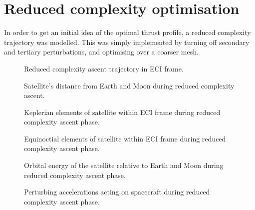  

\section{Reduced complexity optimisation}

In order to get an initial idea of the optimal thrust profile, a reduced complexity trajectory was modelled. This was simply implemented by turning off secondary and tertiary perturbations, and optimising over a coarser mesh. 


\begin{figure}
\centering
\def\svgwidth{\figurewidth}

\caption{Reduced complexity ascent trajectory in ECI frame.}
\label{fig:Ascent2-3D}
\end{figure}

\begin{figure}
\centering
\def\svgwidth{\figurewidth}

\caption{Satellite's distance from Earth and Moon during reduced complexity ascent.}
\label{fig:Ascent2-dist}
\end{figure}

\begin{figure}
\centering
\def\svgwidth{\figurewidth}

\caption{Keplerian elements of satellite within ECI frame during reduced complexity ascent phase.}
\label{fig:Ascent2-kep}
\end{figure}

\begin{figure}
\centering
\def\svgwidth{\figurewidth}

\caption{Equinoctial elements of satellite within ECI frame during reduced complexity ascent phase.}
\label{fig:Ascent2-mee}
\end{figure}

\begin{figure}
\centering
\def\svgwidth{\figurewidth}

\caption{Orbital energy of the satellite relative to Earth and Moon during reduced complexity ascent phase.}
\label{fig:Ascent2-orbeng}
\end{figure}

\begin{figure}
\centering
\def\svgwidth{\figurewidth}

\caption{Perturbing accelerations acting on spacecraft during reduced complexity ascent phase.}
\label{fig:Ascent2-pert}
\end{figure}

